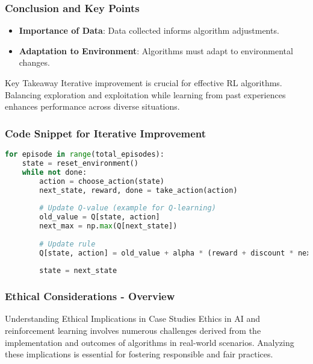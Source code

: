 \documentclass[aspectratio=169]{beamer}
\begin{document}
\begin{frame}[fragile]
    \frametitle{Conclusion and Key Points}
    \begin{itemize}
        \item \textbf{Importance of Data}: Data collected informs algorithm adjustments.
        \item \textbf{Adaptation to Environment}: Algorithms must adapt to environmental changes.
    \end{itemize}
    \begin{block}{Key Takeaway}
        Iterative improvement is crucial for effective RL algorithms. Balancing exploration and exploitation while learning from past experiences enhances performance across diverse situations.
    \end{block}
\end{frame}

\begin{frame}[fragile]
    \frametitle{Code Snippet for Iterative Improvement}
    \begin{lstlisting}[language=Python]
for episode in range(total_episodes):
    state = reset_environment()
    while not done:
        action = choose_action(state)
        next_state, reward, done = take_action(action)
        
        # Update Q-value (example for Q-learning)
        old_value = Q[state, action]
        next_max = np.max(Q[next_state])
        
        # Update rule
        Q[state, action] = old_value + alpha * (reward + discount * next_max - old_value)
        
        state = next_state
    \end{lstlisting}
\end{frame}

\begin{frame}[fragile]
    \frametitle{Ethical Considerations - Overview}
    \begin{block}{Understanding Ethical Implications in Case Studies}
        Ethics in AI and reinforcement learning involves numerous challenges derived from the implementation and outcomes of algorithms in real-world scenarios. Analyzing these implications is essential for fostering responsible and fair practices.
    \end{block}
\end{frame}
\end{document}
